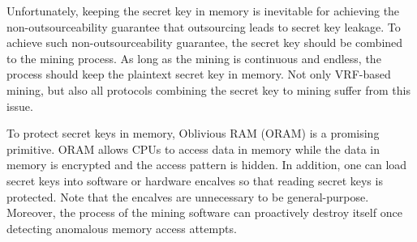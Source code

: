 Unfortunately, keeping the secret key in memory is inevitable for achieving the non-outsourceability guarantee that outsourcing leads to secret key leakage. To achieve such non-outsourceability guarantee, the secret key should be combined to the mining process. As long as the mining is continuous and endless, the process should keep the plaintext secret key in memory. Not only VRF-based mining, but also all protocols combining the secret key to mining suffer from this issue.


To protect secret keys in memory, Oblivious RAM (ORAM) is a promising primitive. ORAM allows CPUs to access data in memory while the data in memory is encrypted and the access pattern is hidden. In addition, one can load secret keys into software or hardware encalves so that reading secret keys is protected. Note that the encalves are unnecessary to be general-purpose. Moreover, the process of the mining software can proactively destroy itself once detecting anomalous memory access attempts.
